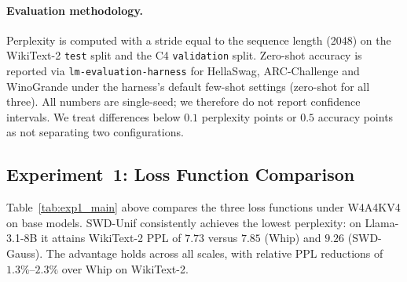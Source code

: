 \documentclass[11pt,a4paper]{article}
\begin{document}
\paragraph{Evaluation methodology.} Perplexity is computed with a stride equal to the sequence length (2048) on the WikiText-2 \texttt{test} split and the C4 \texttt{validation} split. Zero-shot accuracy is reported via \texttt{lm-evaluation-harness} for HellaSwag, ARC-Challenge and WinoGrande under the harness's default few-shot settings (zero-shot for all three). All numbers are single-seed; we therefore do not report confidence intervals. We treat differences below $0.1$ perplexity points or $0.5$ accuracy points as not separating two configurations.
 
 
\subsection{Experiment~1: Loss Function Comparison}
\label{sec:exp1}
 
Table~\ref{tab:exp1_main} above compares the three loss functions under W4A4KV4 on base models. SWD-Unif consistently achieves the lowest perplexity: on Llama-3.1-8B it attains WikiText-2 PPL of $7.73$ versus $7.85$ (Whip) and $9.26$ (SWD-Gauss). The advantage holds across all scales, with relative PPL reductions of $1.3\%$--$2.3\%$ over Whip on WikiText-2.
 
\end{document}
